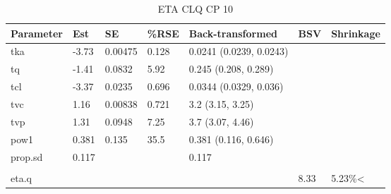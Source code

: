 \begin{table}
\centering\centering
\caption{ETA CLQ CP 10}
\centering
\fontsize{8}{10}\selectfont
\begin{tabular}[t]{lllllll}
\toprule
\textbf{Parameter} & \textbf{Est} & \textbf{SE} & \textbf{\%RSE} & \textbf{Back-transformed} & \textbf{BSV} & \textbf{Shrinkage}\\
\midrule
tka & -3.73 & 0.00475 & 0.128 & 0.0241 (0.0239, 0.0243) &  & \\
\midrule
tq & -1.41 & 0.0832 & 5.92 & 0.245 (0.208, 0.289) &  & \\
\midrule
tcl & -3.37 & 0.0235 & 0.696 & 0.0344 (0.0329, 0.036) &  & \\
\midrule
tvc & 1.16 & 0.00838 & 0.721 & 3.2 (3.15, 3.25) &  & \\
\midrule
tvp & 1.31 & 0.0948 & 7.25 & 3.7 (3.07, 4.46) &  & \\
\midrule
pow1 & 0.381 & 0.135 & 35.5 & 0.381 (0.116, 0.646) &  & \\
\midrule
prop.sd & 0.117 &  &  & 0.117 &  & \\
\midrule\\
eta.q &  &  &  &  & 8.33 & 5.23\%<\\
\bottomrule
\end{tabular}
\end{table}